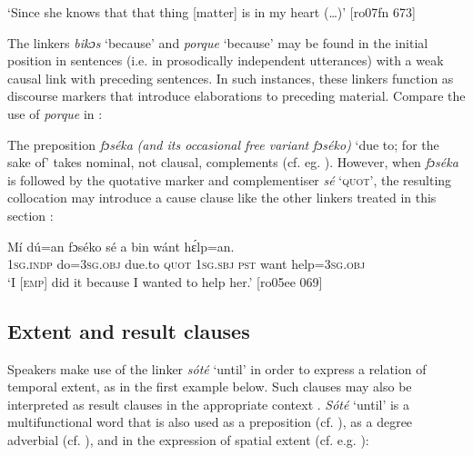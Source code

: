 \glt ‘Since she knows that that thing [matter] is in my heart (…)’ [ro07fn 673]
\z

The linkers\textit{ bikɔs} ‘because’ and \textit{porque} ‘because’ may be found in the initial position in sentences (i.e. in prosodically independent utterances) with a weak causal link with preceding sentences. In such instances, these linkers function as discourse markers that introduce elaborations to preceding material. Compare the use of \textit{porque} in :


\ea%
    \label{ex:key:1508}
\z\z

The preposition \textit{fɔséka} \textit{\textup{(and its occasional free variant} }\textit{fɔséko}\textit{)} ‘due to; for the sake of’ takes nominal, not clausal, complements (cf. eg. ). However, when \textit{fɔséka} is followed by the quotative marker and complementiser \textit{sé} ‘\textsc{quot}’, the resulting collocation may introduce a cause clause like the other linkers treated in this section :


\ea%
    \label{ex:key:1509}
    \gll Mí    dú=an    fɔséko  sé    a    bin  wánt  hɛ́lp=an.\\
\textsc{1sg.indp}  do=\textsc{3sg.obj}  due.to  \textsc{quot}    \textsc{1sg.sbj}  \textsc{pst}  want  help=\textsc{3sg.obj}\\

\glt ‘I [\textsc{emp}] did it because I wanted to help her.’ [ro05ee 069]
\z

\subsection{Extent and result clauses}

Speakers make use of the linker \textit{sóté} ‘until’ in order to express a relation of temporal extent, as in the first example below. Such clauses may also be interpreted as result clauses in the appropriate context . \textit{Sóté} ‘until’ is a multifunctional word that is also used as a preposition (cf. ), as a degree adverbial (cf. ), and in the expression of spatial extent (cf. e.g. ):


